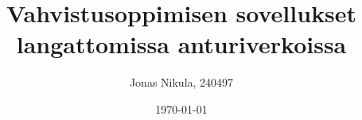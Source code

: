 \documentclass[a4paper,finnish]{article}
\author{Jonas Nikula, 240497}
\title{Vahvistusoppimisen sovellukset langattomissa anturiverkoissa}
\date{\today}
\begin{document}
\maketitle



\tableofcontents






\clearpage{}
\printbibliography{}
\end{document}
